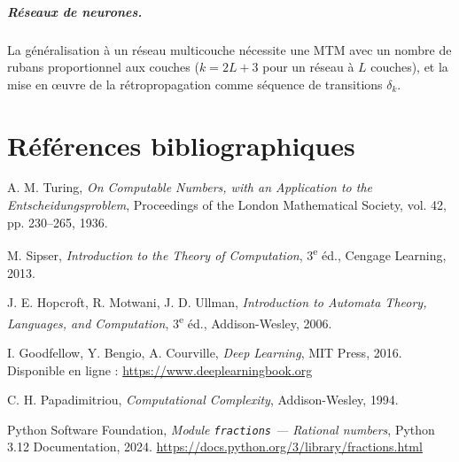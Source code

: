 \documentclass[12pt, a4paper, oneside]{report}
\begin{document}
\paragraph{Réseaux de neurones.} La généralisation à un réseau multicouche nécessite une MTM avec un nombre de rubans proportionnel aux couches ($k = 2L + 3$ pour un réseau à $L$ couches), et la mise en œuvre de la rétropropagation comme séquence de transitions $\delta_k$.

\chapter*{Références bibliographiques}

\begin{enumerate}[leftmargin=*, label={[\arabic*]}]
  \item \label{ref:turing}
    A. M. Turing, \textit{On Computable Numbers, with an Application to the Entscheidungsproblem}, Proceedings of the London Mathematical Society, vol. 42, pp. 230--265, 1936.

  \item \label{ref:sipser}
    M. Sipser, \textit{Introduction to the Theory of Computation}, 3\textsuperscript{e} éd., Cengage Learning, 2013.

  \item \label{ref:hopcroft}
    J. E. Hopcroft, R. Motwani, J. D. Ullman, \textit{Introduction to Automata Theory, Languages, and Computation}, 3\textsuperscript{e} éd., Addison-Wesley, 2006.

  \item \label{ref:goodfellow}
    I. Goodfellow, Y. Bengio, A. Courville, \textit{Deep Learning}, MIT Press, 2016. Disponible en ligne : \url{https://www.deeplearningbook.org}

  \item \label{ref:papadimitriou}
    C. H. Papadimitriou, \textit{Computational Complexity}, Addison-Wesley, 1994.

  \item \label{ref:python-fractions}
    Python Software Foundation, \textit{Module \texttt{fractions} — Rational numbers}, Python 3.12 Documentation, 2024. \url{https://docs.python.org/3/library/fractions.html}
\end{enumerate}

\appendix
\end{document}

